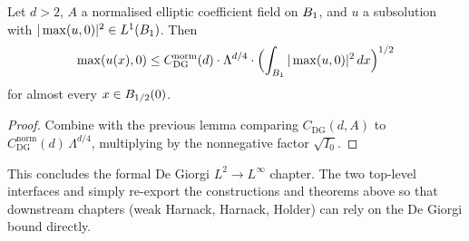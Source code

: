 \begin{theorem}
\label{thm:linfty_subsolution_DeGiorgi_normalized}
\leanok
{}
Let $d > 2$, $A$ a normalised elliptic coefficient field on
$B_{1}$, and $u$ a subsolution with
$|\max(u,0)|^2 \in L^1(B_{1})$. Then
\begin{equation*}
  \max(u(x), 0) \le
    C^{\mathrm{norm}}_{\mathrm{DG}}(d) \cdot \Lambda^{d/4} \cdot
    \Bigl(\int_{B_{1}} |\max(u,0)|^2 \, dx\Bigr)^{1/2}
\end{equation*}
for almost every $x \in B_{1/2}(0)$.
\end{theorem}

\begin{proof}
\leanok
{}

Combine  with the previous
lemma comparing $C_{\mathrm{DG}}(d,A)$ to
$C^{\mathrm{norm}}_{\mathrm{DG}}(d) \, \Lambda^{d/4}$, multiplying
by the nonnegative factor $\sqrt{I_0}$.
\end{proof}

This concludes the formal De Giorgi $L^2 \to L^\infty$ chapter. The
two top-level interfaces  and
 simply re-export the constructions and
theorems above so that downstream chapters (weak Harnack, Harnack,
Holder) can rely on the De Giorgi bound directly.


